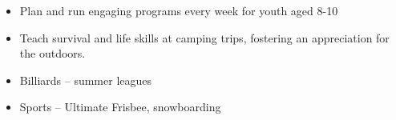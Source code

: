 \documentclass{resume}
\begin{document}
\VolunteerWorkExperience

\begin{itemize}
	\item Plan and run engaging programs every week for youth aged 8-10
	\item Teach survival and life skills at camping trips, fostering an appreciation for the outdoors.
\end{itemize}

\Education


\Intrests

\begin{itemize}
	\item Billiards -- summer leagues
	\item Sports -- Ultimate Frisbee, snowboarding
\end{itemize}
\end{document}
